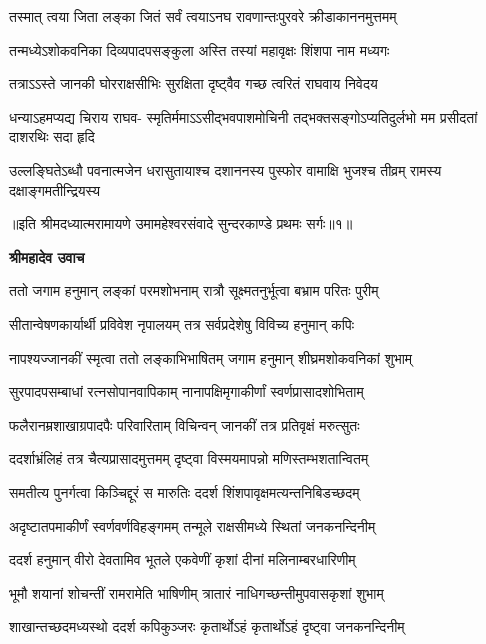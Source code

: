 \twolineshloka
{तस्मात् त्वया जिता लङ्का जितं सर्वं त्वयाऽनघ}
{रावणान्तःपुरवरे क्रीडाकाननमुत्तमम्} %

\twolineshloka
{तन्मध्येऽशोकवनिका दिव्यपादपसङ्कुला}
{अस्ति तस्यां महावृक्षः शिंशपा नाम मध्यगः} %

\twolineshloka
{तत्राऽऽस्ते जानकी घोरराक्षसीभिः सुरक्षिता}
{दृष्ट्वैव गच्छ त्वरितं राघवाय निवेदय} %

\fourlineindentedshloka
{धन्याऽहमप्यद्य चिराय राघव-}
{स्मृतिर्ममाऽऽसीद्भवपाशमोचिनी}
{तद्भक्तसङ्गोऽप्यतिदुर्लभो मम}
{प्रसीदतां दाशरथिः सदा हृदि} %

\fourlineindentedshloka
{उल्लङ्घितेऽब्धौ पवनात्मजेन}
{धरासुतायाश्च दशाननस्य}
{पुस्फोर वामाक्षि भुजश्च तीव्रम्}
{रामस्य दक्षाङ्गमतीन्द्रियस्य} %

{॥इति श्रीमदध्यात्मरामायणे उमामहेश्वरसंवादे सुन्दरकाण्डे
प्रथमः सर्गः॥१॥
}




\textbf{श्रीमहादेव उवाच}

\twolineshloka
{ततो जगाम हनुमान् लङ्कां परमशोभनाम्}
{रात्रौ सूक्ष्मतनुर्भूत्वा बभ्राम परितः पुरीम्} %

\twolineshloka
{सीतान्वेषणकार्यार्थी प्रविवेश नृपालयम्}
{तत्र सर्वप्रदेशेषु विविच्य हनुमान् कपिः} %

\twolineshloka
{नापश्यज्जानकीं स्मृत्वा ततो लङ्काभिभाषितम्}
{जगाम हनुमान् शीघ्रमशोकवनिकां शुभाम्} %

\twolineshloka
{सुरपादपसम्बाधां रत्नसोपानवापिकाम्}
{नानापक्षिमृगाकीर्णां स्वर्णप्रासादशोभिताम्} %

\twolineshloka
{फलैरानम्रशाखाग्रपादपैः परिवारिताम्}
{विचिन्वन् जानकीं तत्र प्रतिवृक्षं मरुत्सुतः} %

\twolineshloka
{ददर्शाभ्रंलिहं तत्र चैत्यप्रासादमुत्तमम्}
{दृष्ट्वा विस्मयमापन्नो मणिस्तम्भशतान्वितम्} %

\twolineshloka
{समतीत्य पुनर्गत्वा किञ्चिद्दूरं स मारुतिः}
{ददर्श शिंशपावृक्षमत्यन्तनिबिडच्छदम्} %

\twolineshloka
{अदृष्टातपमाकीर्णं स्वर्णवर्णविहङ्गमम्}
{तन्मूले राक्षसीमध्ये स्थितां जनकनन्दिनीम्} %

\twolineshloka
{ददर्श हनुमान् वीरो देवतामिव भूतले}
{एकवेणीं कृशां दीनां मलिनाम्बरधारिणीम्} %

\twolineshloka
{भूमौ शयानां शोचन्तीं रामरामेति भाषिणीम्}
{त्रातारं नाधिगच्छन्तीमुपवासकृशां शुभाम्} %

\twolineshloka
{शाखान्तच्छदमध्यस्थो ददर्श कपिकुञ्जरः}
{कृतार्थोऽहं कृतार्थोऽहं दृष्ट्वा जनकनन्दिनीम्} %


